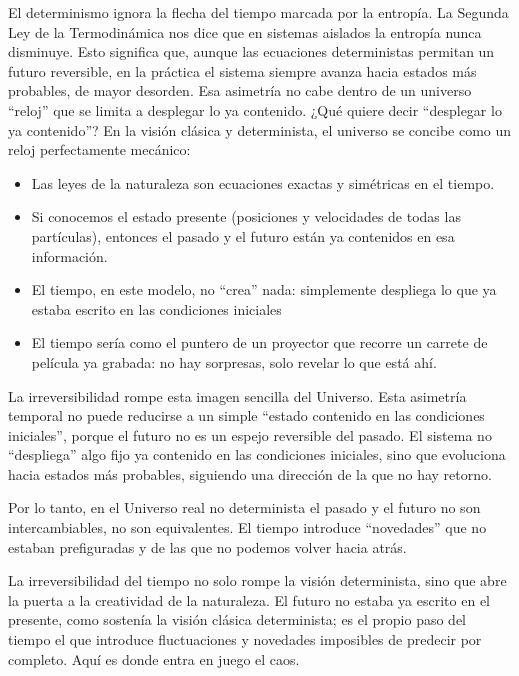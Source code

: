 \documentclass[
  10pt,
  a4paper,
  DIV=11,
  numbers=noendperiod,
  open=any]{scrreprt}
\providecommand{\tightlist}{%
  \setlength{\itemsep}{0pt}\setlength{\parskip}{0pt}}
\numberwithin{equation}{chapter}
\numberwithin{equation}{section}
\renewcommand{\[}{\begin{equation}}
\renewcommand{\]}{\end{equation}}
\begin{document}
El determinismo ignora la flecha del tiempo marcada por la entropía. La
Segunda Ley de la Termodinámica nos dice que en sistemas aislados la
entropía nunca disminuye. Esto significa que, aunque las ecuaciones
deterministas permitan un futuro reversible, en la práctica el sistema
siempre avanza hacia estados más probables, de mayor desorden. Esa
asimetría no cabe dentro de un universo ``reloj'' que se limita a
desplegar lo ya contenido. ¿Qué quiere decir ``desplegar lo ya
contenido''? En la visión clásica y determinista, el universo se concibe
como un reloj perfectamente mecánico:

\begin{itemize}
\tightlist
\item
  Las leyes de la naturaleza son ecuaciones exactas y simétricas en el
  tiempo.
\item
  Si conocemos el estado presente (posiciones y velocidades de todas las
  partículas), entonces el pasado y el futuro están ya contenidos en esa
  información.
\item
  El tiempo, en este modelo, no ``crea'' nada: simplemente despliega lo
  que ya estaba escrito en las condiciones iniciales
\item
  El tiempo sería como el puntero de un proyector que recorre un carrete
  de película ya grabada: no hay sorpresas, solo revelar lo que está
  ahí.
\end{itemize}

La irreversibilidad rompe esta imagen sencilla del Universo. Esta
asimetría temporal no puede reducirse a un simple ``estado contenido en
las condiciones iniciales'', porque el futuro no es un espejo reversible
del pasado. El sistema no ``despliega'' algo fijo ya contenido en las
condiciones iniciales, sino que evoluciona hacia estados más probables,
siguiendo una dirección de la que no hay retorno.

Por lo tanto, en el Universo real no determinista el pasado y el futuro
no son intercambiables, no son equivalentes. El tiempo introduce
``novedades'' que no estaban prefiguradas y de las que no podemos volver
hacia atrás.

La irreversibilidad del tiempo no solo rompe la visión determinista,
sino que abre la puerta a la creatividad de la naturaleza. El futuro no
estaba ya escrito en el presente, como sostenía la visión clásica
determinista; es el propio paso del tiempo el que introduce
fluctuaciones y novedades imposibles de predecir por completo. Aquí es
donde entra en juego el caos.
\end{document}
